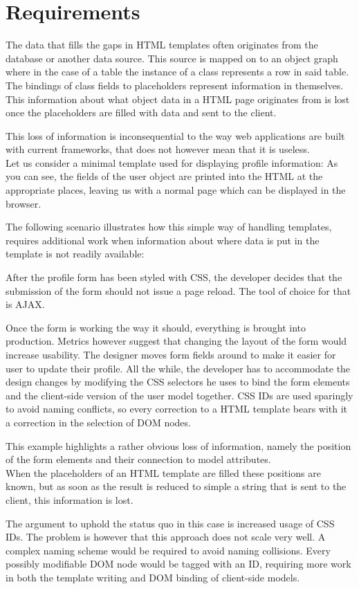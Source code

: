 \chapter{Requirements}
The data that fills the gaps in HTML templates often originates from the
database or another data source. This source is mapped on to an object graph
where in the case of a table the instance of a class represents a row in
said table.
The bindings of class fields to placeholders represent information in
themselves. This information about what object data in a HTML page originates
from is lost once the placeholders are filled with data and sent to the client.

This loss of information is inconsequential to the way web applications are
built with current frameworks, that does not however mean that it is useless.\\
Let us consider a minimal template used for displaying profile information:
\todo{\dots}
As you can see, the fields of the user object are printed into the HTML
at the appropriate places, leaving us with a normal page which can be
displayed in the browser.

The following scenario illustrates how this simple way of handling templates,
requires additional work when information about where data is put in the
template is not readily available:

\begin{shaded}
After the profile form has been styled with CSS, the developer decides that
the submission of the form should not issue a page reload. The tool of choice
for that is AJAX.

Once the form is working the way it should, everything is brought into
production. Metrics however suggest that changing the layout of the form would
increase usability.
The designer moves form fields around to make it easier for user to update
their profile.
All the while, the developer has to accommodate the design changes by modifying
the CSS selectors he uses to bind the form elements and the client-side version
of the user model together.
CSS IDs are used sparingly to avoid naming conflicts, so every correction
to a HTML template bears with it a correction in the selection of DOM nodes.
\end{shaded}
This example highlights a rather obvious loss of information, namely
the position of the form elements and their connection to model attributes.\\
When the placeholders of an HTML template are filled these positions are known,
but as soon as the result is reduced to simple a string that is sent
to the client, this information is lost.

The argument to uphold the status quo in this case is increased usage of
CSS IDs. The problem is however that this approach does not scale very well.
A complex naming scheme would be required to avoid naming collisions.
Every possibly modifiable DOM node would be tagged with an ID,
requiring more work in both the template writing and DOM binding of
client-side models.
